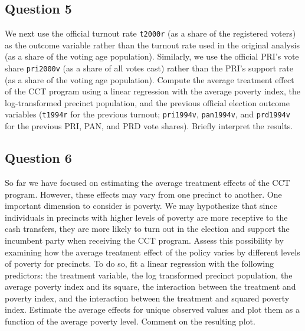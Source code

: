 \documentclass[]{article}
\begin{document}
\subsection{Question 5}\label{question-5}

We next use the official turnout rate \texttt{t2000r} (as a share of the
registered voters) as the outcome variable rather than the turnout rate
used in the original analysis (as a share of the voting age population).
Similarly, we use the official PRI's vote share \texttt{pri2000v} (as a
share of all votes cast) rather than the PRI's support rate (as a share
of the voting age population). Compute the average treatment effect of
the CCT program using a linear regression with the average poverty
index, the log-transformed precinct population, and the previous
official election outcome variables (\texttt{t1994r} for the previous
turnout; \texttt{pri1994v}, \texttt{pan1994v}, and \texttt{prd1994v} for
the previous PRI, PAN, and PRD vote shares). Briefly interpret the
results.

\subsection{Question 6}\label{question-6}

So far we have focused on estimating the average treatment effects of
the CCT program. However, these effects may vary from one precinct to
another. One important dimension to consider is poverty. We may
hypothesize that since individuals in precincts with higher levels of
poverty are more receptive to the cash transfers, they are more likely
to turn out in the election and support the incumbent party when
receiving the CCT program. Assess this possibility by examining how the
average treatment effect of the policy varies by different levels of
poverty for precincts. To do so, fit a linear regression with the
following predictors: the treatment variable, the log transformed
precinct population, the average poverty index and its square, the
interaction between the treatment and poverty index, and the interaction
between the treatment and squared poverty index. Estimate the average
effects for unique observed values and plot them as a function of the
average poverty level. Comment on the resulting plot.
\end{document}
